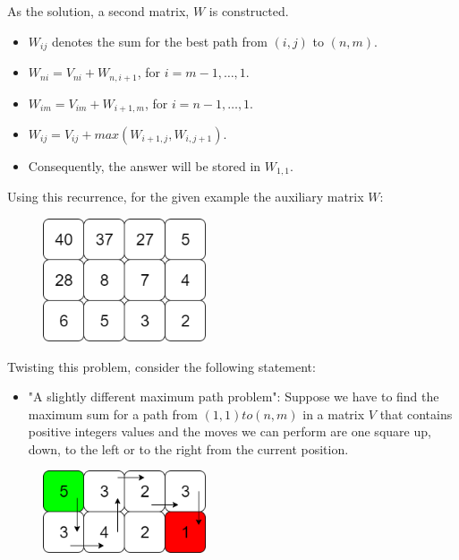 \documentclass[letterpaper]{article}
\begin{document}
As the solution, a second matrix, $W$ is constructed.

\begin{itemize}
    \item $W_{ij}$ denotes the sum for the best path from $(i, j)$ to $(n,m )$.

    \item $W_{ni} = V_{ni} + W_{n, i + 1}$, for $i = m - 1, \dots, 1$.

    \item $W_{im} = V_{im} + W_{i + 1, m}$, for $i = n - 1, \dots, 1$.

    \item $W_{ij} = V_{ij} + max(W_{i + 1, j}, W_{i, j + 1})$.

    \item Consequently, the answer will be stored in $W_{1,1}$.
\end{itemize}

Using this recurrence, for the given example the auxiliary matrix $W$:

\begin{figure} [h!]
\centering
\includegraphics[width=0.43\textwidth]{pngOfDiagrams/gamesandpaths6.png}
\end{figure}

\newpage

Twisting this problem, consider the following statement:

\begin{itemize}
    \item "A slightly different maximum path problem": Suppose we have to find the maximum sum for a path from $(1,1) to (n,m)$ in a matrix $V$ that contains positive integers values and the moves we can perform are one square up, down, to the left or to the right from the current position.
\end{itemize}

\begin{figure} [h!]
\centering
\includegraphics[width=0.43\textwidth]{pngOfDiagrams/gamesandpaths7.png}
\end{figure}
\end{document}
